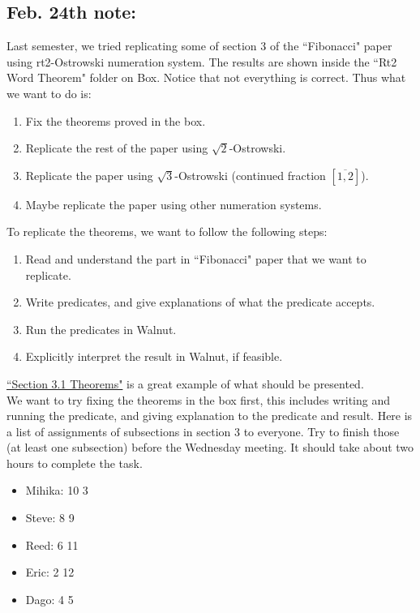 \documentclass{article}
\theoremstyle{definition}
\theoremstyle{remark}
\theoremstyle{remark}
\theoremstyle{plain}
\theoremstyle{definition}
\begin{document}
\subsection{Feb. 24th note:}
Last semester, we tried replicating some of section 3 of the ``Fibonacci" paper using rt2-Ostrowski numeration system. The results are shown inside the ``Rt2 Word Theorem" folder on Box. Notice that not everything is correct. Thus what we want to do is:
\begin{enumerate}
    \item Fix the theorems proved in the box. 
    \item Replicate the rest of the paper using $\sqrt2$-Ostrowski.
    \item Replicate the paper using $\sqrt3$-Ostrowski (continued fraction $[\overline{1,2}]$). 
    \item Maybe replicate the paper using other numeration systems.
\end{enumerate}

To replicate the theorems, we want to follow the following steps:
\begin{enumerate}
    \item Read and understand the part in ``Fibonacci" paper that we want to replicate.
    \item Write predicates, and give explanations of what the predicate accepts.
    \item Run the predicates in Walnut.
    \item Explicitly interpret the result in Walnut, if feasible. 
\end{enumerate}
\href{https://app.box.com/folder/68301544796}{``Section 3.1 Theorems"} is a great example of what should be presented. \\

We want to try fixing the theorems in the box first, this includes writing and running the predicate, and giving explanation to the predicate and result. Here is a list of assignments of subsections in section 3 to everyone. Try to finish those (at least one subsection) before the Wednesday meeting. It should take about two hours to complete the task. 
 
\begin{itemize}
    \item Mihika: 10 3 
    \item Steve: 8 9
    \item Reed: 6 11
    \item Eric: 2 12
    \item Dago: 4 5
\end{itemize}
\end{document}
